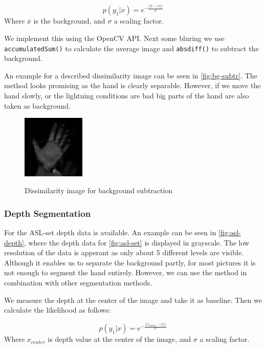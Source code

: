 \documentclass[letterpaper, 10 pt, conference]{ieeeconf}  %
\begin{document}
\begin{equation}
p(y_1 | x) = e^{-\frac{||\bar{x}-x||)}{\sigma}}
\label{eq:backg}
\end{equation}
Where $\bar{x}$ is the background, and $\sigma$ a scaling factor.

We implement this using the OpenCV API. Next some bluring we use \texttt{accumulatedSum()} to calculate the average image and \texttt{absdiff()} to subtract the background.

An example for a described dissimilarity image can be seen in \autoref{fig:bg-subtr}. The method looks promising as the hand is clearly separable. However, if we move the hand slowly, or the lightning conditions are bad big parts of the hand are also taken as background.

\begin{figure}
	\centering
	\includegraphics[height=3cm]{bg-subtr}
	\label{fig:tm-segment}
	\caption{Dissimilarity image for background subtraction}
\end{figure}

\subsubsection{Depth Segmentation}

For the ASL-set depth data is available. An example can be seen in \autoref{fig:asl-depth}, where the depth data for \autoref{fig:asl-set} is displayed in grayscale. The low resolution of the data is apperant as only about 5 different levels are visible. Although it enables us to separate the background partly, for most pictures it is not enough to segment the hand entirely. However, we can use the method in combination with other segmentation methods.

We measure the depth at the center of the image and take it as baseline. Then we calculate the likelihood as follows:

\begin{equation}
p(y_1 | x) = e^{-\frac{||x_{center}-x||)}{\sigma}}
\label{eq:backg}
\end{equation}
Where $x_ {center}$ is depth value at the center of the image, and $\sigma$ a scaling factor.
\end{document}

